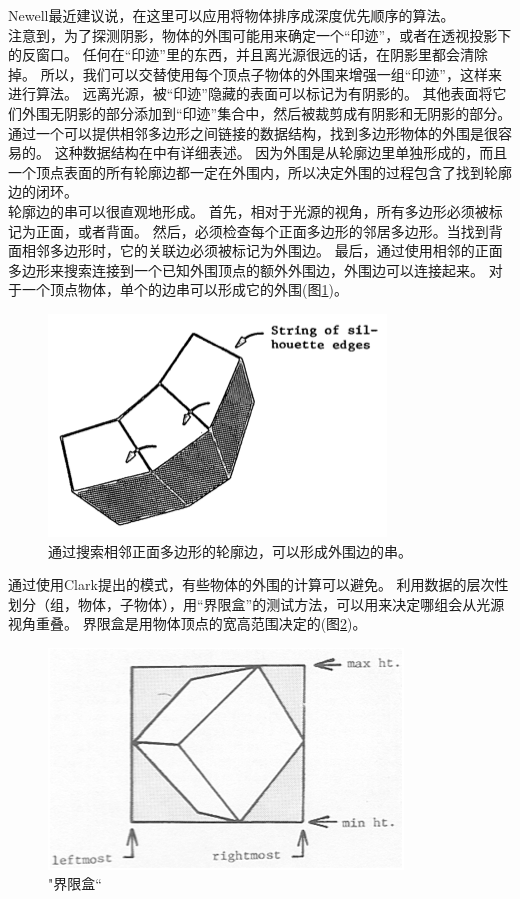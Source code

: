 Newell最近建议说，在这里可以应用将物体排序成深度优先顺序的算法\cite{10}。\\
注意到，为了探测阴影，物体的外围可能用来确定一个“印迹”，或者在透视投影下的反窗口。
任何在“印迹”里的东西，并且离光源很远的话，在阴影里都会清除掉。
所以，我们可以交替使用每个顶点子物体的外围来增强一组“印迹”，这样来进行算法。
远离光源，被“印迹”隐藏的表面可以标记为有阴影的。
其他表面将它们外围无阴影的部分添加到“印迹”集合中，然后被裁剪成有阴影和无阴影的部分。\\
通过一个可以提供相邻多边形之间链接的数据结构，找到多边形物体的外围是很容易的。
这种数据结构在\cite{6}\cite{8}中有详细表述。
因为外围是从轮廓边里单独形成的，而且一个顶点表面的所有轮廓边都一定在外围内，所以决定外围的过程包含了找到轮廓边的闭环。\\
轮廓边的串可以很直观地形成。
首先，相对于光源的视角，所有多边形必须被标记为正面，或者背面。
然后，必须检查每个正面多边形的邻居多边形。当找到背面相邻多边形时，它的关联边必须被标记为外围边。
最后，通过使用相邻的正面多边形来搜索连接到一个已知外围顶点的额外外围边，外围边可以连接起来。
对于一个顶点物体，单个的边串可以形成它的外围(图\ref{fig:fig2})。\\
\begin{figure}[h]
\centering
\includegraphics[width=0.9\linewidth]{fig2}
\caption[fig2]{通过搜索相邻正面多边形的轮廓边，可以形成外围边的串。}
\label{fig:fig2}
\end{figure}
通过使用Clark提出的模式，有些物体的外围的计算可以避免。
利用数据的层次性划分（组，物体，子物体），用“界限盒”的测试方法，可以用来决定哪组会从光源视角重叠。
界限盒是用物体顶点的宽高范围决定的(图\ref{fig:fig3})。
\begin{figure}[h]
\centering
\includegraphics[width=0.9\linewidth]{fig3}
\caption[fig3]{"界限盒“}
\label{fig:fig3}
\end{figure}
